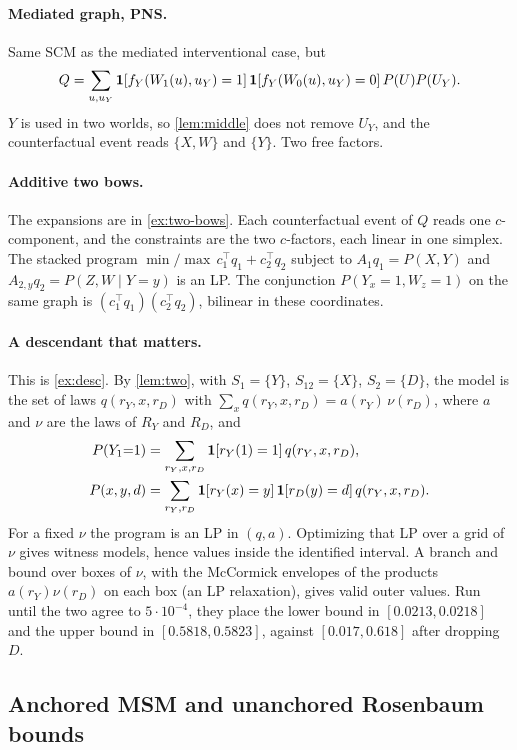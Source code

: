 \paragraph{Mediated graph, PNS.}
Same SCM as the mediated interventional case, but
\[
Q
=
\sum_{u,u_Y}
\mathbf{1}[f_Y(W_1(u),u_Y)=1]\,
\mathbf{1}[f_Y(W_0(u),u_Y)=0]\,
P(U)P(U_Y).
\]
$Y$ is used in two worlds, so \cref{lem:middle} does not remove $U_Y$, and the
counterfactual event reads $\{X,W\}$ and $\{Y\}$. Two free factors.

\paragraph{Additive two bows.}
The expansions are in \cref{ex:two-bows}. Each counterfactual event of $Q$ reads one
$c$-component, and the constraints are the two $c$-factors, each
linear in one simplex. The stacked program
$\min/\max\,c_1^\top q_1+c_2^\top q_2$ subject to
$A_1 q_1=P(X,Y)$ and $A_{2,y}q_2=P(Z,W\mid Y{=}y)$ is an LP. The conjunction
$P(Y_x{=}1,W_z{=}1)$ on the same graph is $(c_1^\top q_1)(c_2^\top q_2)$,
bilinear in these coordinates.

\paragraph{A descendant that matters.}
This is \cref{ex:desc}. By \cref{lem:two}, with $S_1=\{Y\}$, $S_{12}=\{X\}$,
$S_2=\{D\}$, the model is the set of laws $q(r_Y,x,r_D)$ with
$\sum_x q(r_Y,x,r_D)=a(r_Y)\,\nu(r_D)$, where $a$ and $\nu$ are the laws of
$R_Y$ and $R_D$, and
\begin{align*}
P(Y_1{=}1)&=\sum_{r_Y,x,r_D}\mathbf{1}[r_Y(1)=1]\,q(r_Y,x,r_D),\\
P(x,y,d)&=\sum_{r_Y,r_D}\mathbf{1}[r_Y(x)=y]\,\mathbf{1}[r_D(y)=d]\,q(r_Y,x,r_D).
\end{align*}
For a fixed $\nu$ the program is an LP in $(q,a)$. Optimizing that LP over a
grid of $\nu$ gives witness models, hence values inside the identified
interval. A branch and bound over boxes of $\nu$, with the McCormick envelopes
of the products $a(r_Y)\nu(r_D)$ on each box (an LP relaxation), gives valid
outer values. Run until the two agree to $5\cdot10^{-4}$, they place the lower
bound in $[0.0213,0.0218]$ and the upper bound in $[0.5818,0.5823]$, against
$[0.017,0.618]$ after dropping $D$.

\subsection{Anchored MSM and unanchored Rosenbaum bounds}
\label{app:msm}

